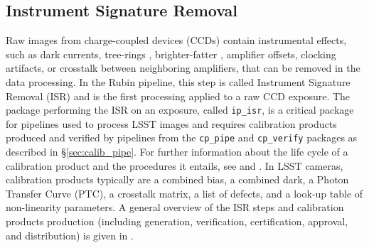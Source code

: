 \subsection{Instrument Signature Removal}
\label{sec:isr}

Raw images from charge-coupled devices (CCDs) contain instrumental effects, such as dark currents, tree-rings \citep{2020JATIS...6a1005P}, brighter-fatter \citep{2024PASP..136d5003B}, amplifier offsets, clocking artifacts, or crosstalk between neighboring amplifiers, that can be removed in the data processing.
In the Rubin pipeline, this step is called Instrument Signature Removal (ISR) and is the first processing applied to a raw CCD exposure.
The package performing the ISR on an exposure, called \texttt{ip\_isr}, is a critical package for pipelines used to process LSST images and requires calibration products produced and verified by pipelines from the \texttt{cp\_pipe} and \texttt{cp\_verify} packages as described in \S\ref{sec:calib_pipe}.
For further information about the life cycle of a calibration product and the procedures it entails, see \citet{DMTN-222} and \citet{SITCOMTN-086}.
In LSST cameras, calibration products typically are a combined bias, a combined dark, a Photon Transfer Curve (PTC), a crosstalk matrix, a list of defects, and a look-up table of non-linearity parameters.
A general overview of the ISR steps and calibration products production (including generation, verification, certification, approval, and distribution) is given in \citet{2025JATIS..11a1209P}.
